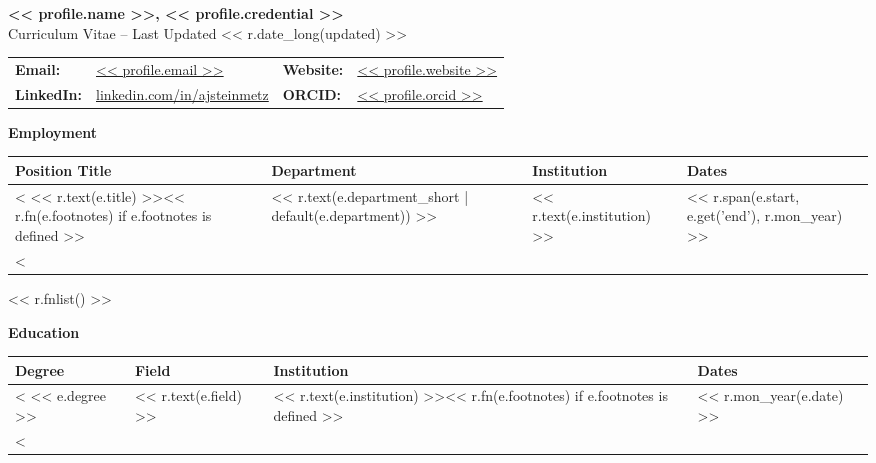 \documentclass[11pt]{article}
\begin{document}

\begin{center}
    {\Large\textbf{<< profile.name >>, << profile.credential >>}}\\[0.5em]
    {\large Curriculum Vitae -- Last Updated << r.date_long(updated) >>}
\end{center}

{\normalsize
\begin{center}
    \begin{tabular}{@{}p{2.0cm} p{5.5cm} p{2.0cm} p{5.5cm}@{}}
        \textbf{Email:} & \href{mailto:<< profile.email >>}{<< profile.email >>} &
        \textbf{Website:} & \href{<< profile.website >>}{<< profile.website >>} \\
        \textbf{LinkedIn:} & \href{<< profile.links.linkedin >>}{linkedin.com/in/ajsteinmetz} &
        \textbf{ORCID:} & \href{https://orcid.org/<< profile.orcid >>}{<< profile.orcid >>} \\
    \end{tabular}
\end{center}
}

\medskip


{\Large\textbf{Employment}}

{\normalsize
\begin{tabular}{@{}p{3.8cm} p{4.4cm} p{5.3cm} p{3.0cm}@{}}
    \toprule
    \textbf{Position Title} & \textbf{Department} & \textbf{Institution} & \textbf{Dates} \\
    \midrule
<%
    << r.text(e.title) >><< r.fn(e.footnotes) if e.footnotes is defined >> & << r.text(e.department_short | default(e.department)) >> & << r.text(e.institution) >> & {\small << r.span(e.start, e.get('end'), r.mon_year) >>} \\
<%
    \bottomrule
\end{tabular}
}

<< r.fnlist() >>

\medskip

{\Large\textbf{Education}}

{\normalsize
\begin{tabular}{@{}p{2.8cm} p{5.0cm} p{5.5cm} p{3.2cm}@{}}
    \toprule
    \textbf{Degree} & \textbf{Field} & \textbf{Institution} & \textbf{Dates} \\
    \midrule
<%
    << e.degree >> & << r.text(e.field) >> & << r.text(e.institution) >><< r.fn(e.footnotes) if e.footnotes is defined >> & << r.mon_year(e.date) >> \\
<%
    \bottomrule
\end{tabular}
}
\end{document}
